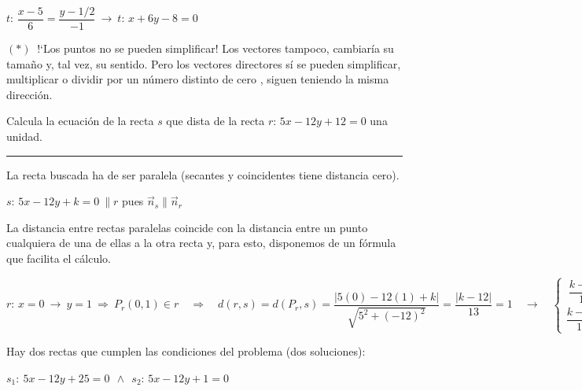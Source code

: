 \begin{miejercicio}
\vspace{2mm} $t:\, \dfrac{x-5}{6}=\dfrac{y-1/2}{-1} \ \to \ t:\, x+6y-8=0$

\vspace{5mm} \textcolor{gris}{$(*)\ $ !`Los puntos no se pueden simplificar! \smiley{}  Los vectores tampoco, cambiaría su tamaño y, tal vez, su sentido. Pero los vectores directores sí se pueden simplificar, multiplicar o dividir por un número distinto de cero , siguen teniendo la misma dirección.}
  
\end{miejercicio}

\begin{miejercicio}

Calcula la ecuación de la recta $s$ que dista de la recta $r:\, 5x-12y+12=0$ una unidad.

\rule{250pt}{0.1pt}

\vspace{2mm} La recta buscada ha de ser paralela (secantes y coincidentes tiene distancia cero). 

$s:\, 5x-12y+k=0 \ \parallel r$ pues $\vec n_s\parallel \vec n_r$

\vspace{2mm} La distancia entre rectas paralelas coincide con la distancia entre un punto cualquiera de una de ellas a la otra recta y, para esto, disponemos de un fórmula que facilita el cálculo.

\vspace{2mm} $r:\, x=0 \ \to \ y=1 \ \Rightarrow \  P_r(0,1)\in r  \quad \Rightarrow \quad d(r,s)=d(P_r,s)=\dfrac{|5(0)-12(1)+k |}{\sqrt{5^2+(-12)^2}}=\dfrac{|k-12|}{13}=1 \quad \to \quad \begin{cases} \ \dfrac{k-12}{13}=1 &\to k=25 \\ \dfrac{k-12}{13}=-1 &\to k=-1 \end{cases}$

\vspace{2mm} Hay dos rectas que cumplen las condiciones del problema (dos soluciones): 

\vspace{2mm}$s_1:\ 5x-12y+25=0 \ \ \wedge \ \ s_2:\, 5x-12y+1=0$
	
\end{miejercicio}

